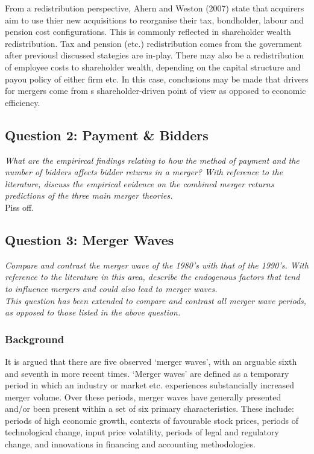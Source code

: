 \documentclass[11pt, english]{article}
\begin{document}
		From a redistribution perspective, Ahern and Weston (2007) state that acquirers aim to use thier new acquisitions to reorganise their tax, bondholder, labour and pension cost configurations. This is commonly reflected in shareholder wealth redistribution. Tax and pension (etc.) redistribution comes from the government after previousl discussed stategies are in-play. There may also be a redistribution of employee costs to shareholder wealth, depending on the capital structure and payou policy of either firm etc. In this case, conclusions may be made that drivers for mergers come from s shareholder-driven point of view as opposed to economic efficiency.

	\newpage 

	\subsection{Question 2: Payment \& Bidders}

	\textit{What are the empirircal findings relating to how the method of payment and the number of bidders affects bidder returns in a merger? With reference to the literature, discuss the empirical evidence on the combined merger returns predictions of the three main merger theories.}\\

	Piss off.

	\newpage

	\subsection{Question 3: Merger Waves}

	\textit{Compare and contrast the merger wave of the 1980’s with that of the 1990’s. With reference to the literature in this area, describe the endogenous factors that tend to influence mergers and could also lead to merger waves.}\\

	\textit{This question has been extended to compare and contrast all merger wave periods, as opposed to those listed in the above question.}

		\subsubsection*{Background}

	It is argued that there are five observed `merger waves', with an arguable sixth and seventh in more recent times. `Merger waves' are defined as a temporary period in which an industry or market etc. experiences substancially increased merger volume. Over these periods, merger waves have generally presented and/or been present within a set of six primary characteristics. These include: periods of high economic growth, contexts of favourable stock prices, periods of technological change, input price volatility, periods of legal and regulatory change, and innovations in financing and accounting methodologies.
\end{document}
